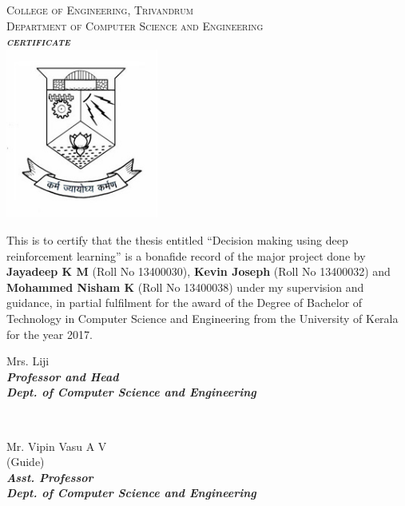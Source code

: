 \documentclass[a4paper,11pt]{report}
\begin{document}
	\begin{titlepage}
		\begin{centering}
			\textsc{\Large{College of Engineering, Trivandrum}}\\
			\textsc{\large{Department of Computer Science and Engineering}}\\[0.5cm]

			\textbf{\textit{\LARGE\textsc{{certificate}}}}\\[0.5cm]
			\includegraphics[width=5cm]{images/logo.jpg}\\

		\end{centering}

		\large{This is to certify that the thesis entitled ``Decision making using deep reinforcement learning'' is a bonafide record of the major project done by \textbf{Jayadeep K M} (Roll No 13400030), \textbf{Kevin Joseph} (Roll No 13400032) and \textbf{Mohammed Nisham K} (Roll No 13400038) under my supervision and guidance, in partial fulfilment for the award of the Degree of Bachelor of Technology in Computer Science and Engineering from the University of Kerala for the year 2017.}\\[1.5cm]

		\begin{minipage}{0.5\textwidth}
		\begin{flushleft}
		\begin{centering} \large
			\large{Mrs. Liji}\\
			\small{\textit{\textbf{Professor and Head}}}\\
			\small{\textit{\textbf{Dept. of Computer Science and Engineering}}}\\
		\end{centering}
		\end{flushleft}
		\end{minipage}
		~
		\begin{minipage}{0.5\textwidth}
		\begin{centering} \large
		\large{Mr. Vipin Vasu A V}\\
		\small{(Guide)}\\
		\small{\textit{\textbf{Asst. Professor}}}\\
		\small{\textit{\textbf{Dept. of Computer Science and Engineering}}}\\[1.5cm]


\end{centering}
\end{minipage}
\end{titlepage}
\end{document}
